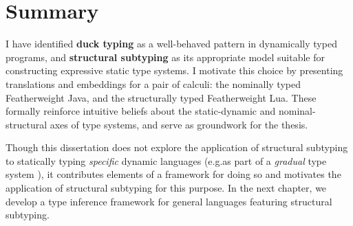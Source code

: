 \section{Summary}

I have identified \textbf{duck typing} as a well-behaved pattern in dynamically typed programs, and \textbf{structural subtyping} as its appropriate model suitable for constructing expressive static type systems. I motivate this choice by presenting translations and embeddings for a pair of calculi: the nominally typed Featherweight Java, and the structurally typed Featherweight Lua. These formally reinforce intuitive beliefs about the static-dynamic and nominal-structural axes of type systems, and serve as groundwork for the thesis.

Though this dissertation does not explore the application of structural subtyping to statically typing \emph{specific} dynamic languages (e.g.\@ as part of a \emph{gradual} type system \cite{gradual-typing-for-objects}), it contributes elements of a framework for doing so and motivates the application of structural subtyping for this purpose. In the next chapter, we develop a type inference framework for general languages featuring structural subtyping.

